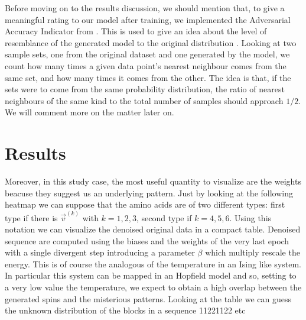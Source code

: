 \documentclass[prl, twocolumn]{revtex4-2}
\begin{document}
Before moving on to the results discussion, we should mention that, to give
a meaningful rating to our model after training, we implemented the
Adversarial Accuracy Indicator from \cite{Yale2020}. This is used to give
an idea about the level of resemblance of the generated model to the
original distribution \cite{Decelle2022}. Looking at two sample sets, one from
the original dataset and one generated by the model, we count how many
times a given data point’s nearest neighbour comes from the same set, and
how many times it comes from the other. The idea is that, if the sets were
to come from the same probability distribution, the ratio of nearest
neighbours of the same kind to the total number of samples should approach
$1 / 2$. We will comment more on the matter later on.


\section{Results}
Moreover, in this study case, the most useful quantity to visualize are the
weights beacuse they suggest us an underlying pattern. Just by looking at
the following heatmap we can suppose that the amino acids are of two
different types: first type if there is $\vec{v}^{(k)}$ with $k=1,2,3$,
second type if $k=4,5,6$. Using this notation we can visualize the denoised
original data in a compact table. Denoised sequence are computed using the
biases and the weights of the very last epoch with a single divergent step
introducing a parameter $\beta$ which multiply rescale the energy. This is
of course the analogous of the temperature in an Ising like system. In
particular this system can be mapped in an Hopfield model and so, setting
to a very low value the temperature, we expect to obtain a high overlap
between the generated spins and the misterious patterns.
Looking at the table we can guess the unknown distribution of the blocks in
a sequence 11221122 etc 


\end{document}
